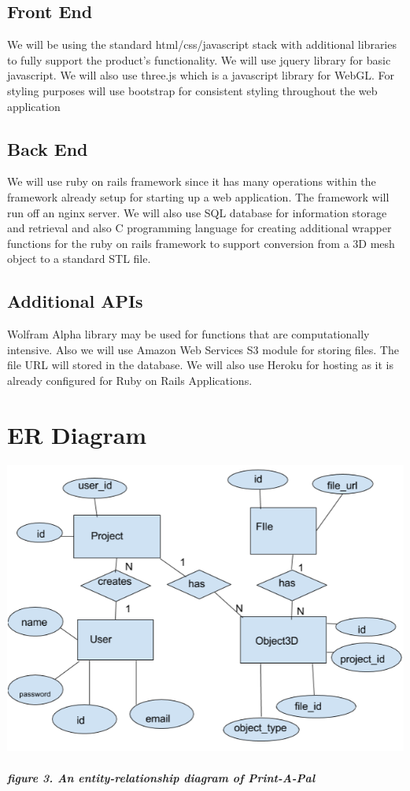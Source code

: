 \documentclass{report}
\begin{document}
\section{Front End}
We will be using the standard html/css/javascript stack with additional libraries to fully support the product’s functionality. We will use jquery library for basic javascript. We will also use three.js which is a javascript library for WebGL. For styling purposes will use bootstrap for consistent styling throughout the web application 
\section{Back End}
We will use ruby on rails framework since it has many operations within the framework already setup for starting up a web application. The framework will run off an nginx server. We will also use SQL database for information storage and retrieval and also C programming language for creating additional wrapper functions for the ruby on rails framework to support conversion from a 3D mesh object to a standard STL file.
\section{Additional APIs}
Wolfram Alpha library may be used for functions that are computationally intensive. Also we will use Amazon Web Services S3 module for storing files. The file URL will stored in the database. We will also use Heroku for hosting as it is already configured for Ruby on Rails Applications. 

\chapter{ER Diagram}
\begin{center}
\includegraphics[width=\textwidth/2]{ER.png}
\end{center}
\paragraph{figure 3. An entity-relationship diagram of Print-A-Pal}
\end{document}
